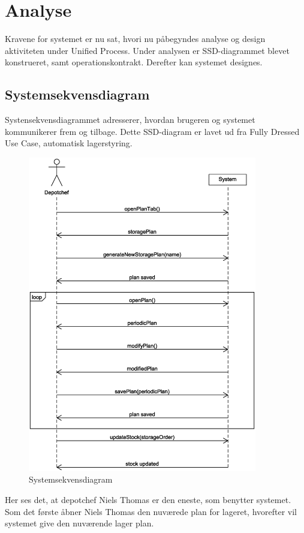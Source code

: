 \chapter{Analyse}\label{ch:analyse}

Kravene for systemet er nu sat, hvori nu påbegyndes analyse og design aktiviteten under Unified Process. Under analysen er SSD-diagrammet blevet konstrueret, samt operationskontrakt. Derefter kan systemet designes. 

\section{Systemsekvensdiagram}
Systensekvensdiagrammet\cite{Larman2004} adresserer, hvordan brugeren og systemet kommunikerer frem og tilbage. Dette SSD-diagram er lavet ud fra Fully Dressed Use Case, automatisk lagerstyring.

\begin{figure}[H]
    \centering
    \includegraphics[width=100mm]{figures/analyse/SSD.eps}
    \caption{Systemsekvensdiagram}
    \label{fig:ssd}
\end{figure}

Her ses det, at depotchef Niels Thomas er den eneste, som benytter systemet. Som det første åbner Niels Thomas den nuværede plan for lageret, hvorefter vil systemet give den nuværende lager plan. 

